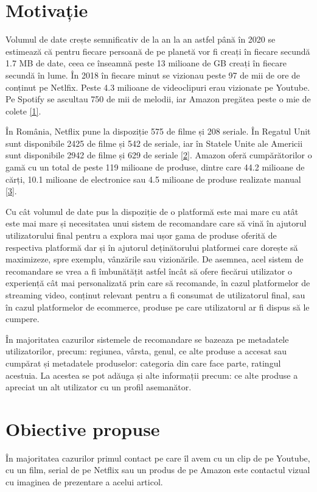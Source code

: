 \section{Motivație}

Volumul de date crește semnificativ de la an la an astfel până în 2020 se estimează că pentru fiecare persoană de pe planetă vor fi creați în fiecare secundă 1.7 MB de date, ceea ce înseamnă peste 13 milioane de GB creați în fiecare secundă în lume. În 2018 în fiecare minut se vizionau peste 97 de mii de ore de conținut pe Netlfix. Peste 4.3 milioane de videoclipuri erau vizionate pe Youtube. Pe Spotify se ascultau 750 de mii de melodii, iar Amazon pregătea peste o mie de colete \hyperlink{domo}{[1]}.

În România, Netflix pune la dispoziție 575 de filme și 208 seriale. În Regatul Unit sunt disponibile 2425 de filme și 542 de seriale, iar în Statele Unite ale Americii sunt disponibile 2942 de filme și 629 de seriale \hyperlink{finder}{[2]}. Amazon oferă cumpărătorilor o gamă cu un total de peste 119 milioane de produse, dintre care 44.2 milioane de cărți, 10.1 milioane de electronice sau 4.5 milioane de produse realizate manual \hyperlink{scrapehero}{[3]}.

Cu cât volumul de date pus la dispoziție de o platformă este mai mare cu atât este mai mare și necesitatea unui sistem de recomandare care să vină în ajutorul utilizatorului final pentru a explora mai ușor gama de produse oferită de respectiva platformă dar și în ajutorul deținătorului platformei care dorește să maximizeze, spre exemplu, vânzările sau vizionările. De asemnea, acel sistem de recomandare se vrea a fi îmbunătățit astfel încât să ofere fiecărui utilizator o experiență cât mai personalizată prin care să recomande, în cazul platformelor de streaming video, conținut relevant pentru a fi consumat de utilizatorul final, sau în cazul platformelor de ecommerce, produse pe care utilizatorul ar fi dispus să le cumpere.

În majoritatea cazurilor sistemele de recomandare se bazeaza pe metadatele utilizatorilor, precum: regiunea, vârsta, genul, ce alte produse a accesat sau cumpărat și metadatele produselor: categoria din care face parte, ratingul acestuia. La acestea se pot adăuga și alte informații precum: ce alte produse a apreciat un alt utilizator cu un profil asemanător.

\section{Obiective propuse}
În majoritatea cazurilor primul contact pe care îl avem cu un clip de pe Youtube, cu un film, serial de pe Netflix sau un produs de pe Amazon este contactul vizual cu imaginea de prezentare a acelui articol. 

